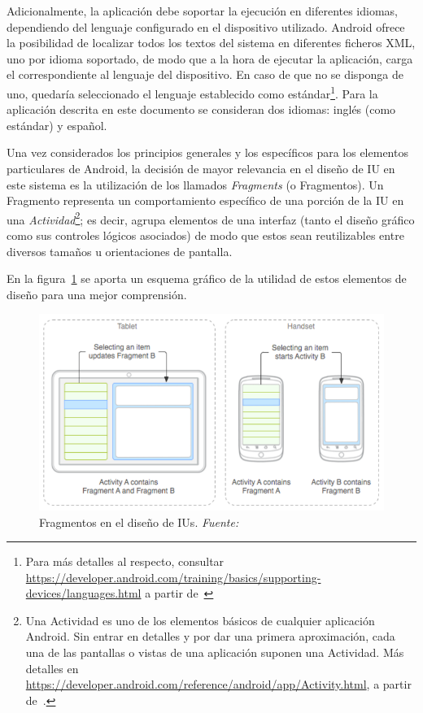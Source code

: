 Adicionalmente, la aplicación debe soportar la ejecución en diferentes idiomas, dependiendo del lenguaje configurado en el dispositivo utilizado. Android ofrece la posibilidad de localizar todos los textos del sistema en diferentes ficheros XML, uno por idioma soportado, de modo que a la hora de ejecutar la aplicación, carga el correspondiente al lenguaje del dispositivo. En caso de que no se disponga de uno, quedaría seleccionado el lenguaje establecido como estándar\footnote{Para más detalles al respecto, consultar \url{https://developer.android.com/training/basics/supporting-devices/languages.html} a partir de~\cite{AnDev}}. Para la aplicación descrita en este documento se consideran dos idiomas: inglés (como estándar) y español.

Una vez considerados los principios generales y los específicos para los elementos particulares de Android, la decisión de mayor relevancia en el diseño de IU en este sistema es la utilización de los llamados \emph{Fragments} (o Fragmentos). Un Fragmento representa un comportamiento específico de una porción de la IU en una \emph{Actividad}\footnote{Una Actividad es uno de los elementos básicos de cualquier aplicación Android. Sin entrar en detalles y por dar una primera aproximación, cada una de las pantallas o vistas de una aplicación suponen una Actividad. Más detalles en \url{https://developer.android.com/reference/android/app/Activity.html}, a partir de~\cite{AnDev}.}; es decir, agrupa elementos de una interfaz (tanto el diseño gráfico como sus controles lógicos asociados) de modo que estos sean reutilizables entre diversos tamaños u orientaciones de pantalla.

En la figura~\ref{fig:fragmentsAndroid} se aporta un esquema gráfico de la utilidad de estos elementos de diseño para una mejor comprensión.

\begin{figure}
	\centering
	\includegraphics[width=\linewidth,height=\textheight,keepaspectratio]{Images/FragmentsAndroid}
	\caption[Fragmentos en el diseño de IUs]{Fragmentos en el diseño de IUs. \textit{Fuente:~\cite{AnDev}}}
	\label{fig:fragmentsAndroid}
\end{figure}

